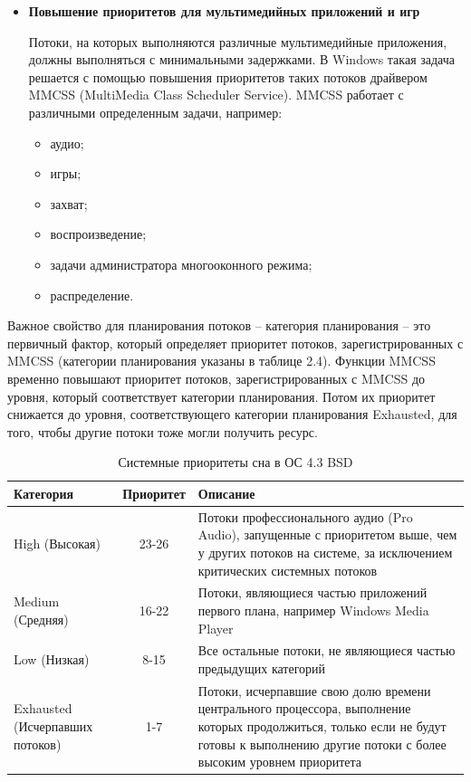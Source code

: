 \begin{itemize}
	\item \textbf{Повышение приоритетов для мультимедийных приложений и игр}
	
	Потоки, на которых выполняются различные мультимедийные приложения, должны выполняться с минимальными задержками. 
	В Windows такая задача решается с помощью повышения приоритетов таких потоков драйвером MMCSS (MultiMedia Class Scheduler Service).
	MMCSS работает с различными определенным задачи, например:
	\begin{itemize}
		\item аудио;
		\item игры;
		\item захват;
		\item воспроизведение;
		\item задачи администратора многооконного режима;
		\item распределение.
	\end{itemize}
\end{itemize}

Важное свойство для планирования потоков – категория планирования
– это первичный фактор, который определяет приоритет потоков, зарегистрированных с MMCSS (категории планирования указаны в таблице 2.4).
Функции MMCSS временно повышают приоритет потоков, зарегистрированных с MMCSS до уровня, который соответствует категории планирования. 
Потом их приоритет снижается до уровня, соответствующего категории планирования Exhausted, для того, чтобы другие потоки тоже могли получить ресурс.

\begin{table}[h]
	\caption{Системные приоритеты сна в ОС 4.3 BSD}
	\begin{center}
		\begin{tabular}{| p{90pt} | c | p{245pt} |} 
			\hline
			\textbf{Категория} & \textbf{Приоритет} & \textbf{Описание}\\
			\hline
			{High (Высокая) } & 23-26  & {Потоки профессионального аудио
				(Pro Audio), запущенные с приоритетом выше, чем у других потоков
				на системе, за исключением критических системных потоков} \\
			\hline
			{Medium (Средняя)} & 16-22  & {Потоки, являющиеся частью приложений первого плана, например
				Windows Media Player}\\
			\hline
			{Low (Низкая)} & 8-15 & {Все остальные потоки, не являющиеся частью предыдущих категорий} \\
			\hline
			{Exhausted (Исчерпавших потоков)} & 1-7 & {Потоки, исчерпавшие свою долю
				времени центрального процессора,
				выполнение которых продолжиться,
				только если не будут готовы к выполнению другие потоки с более высоким уровнем приоритета}\\
			\hline
		\end{tabular}
	\end{center}
\end{table}


